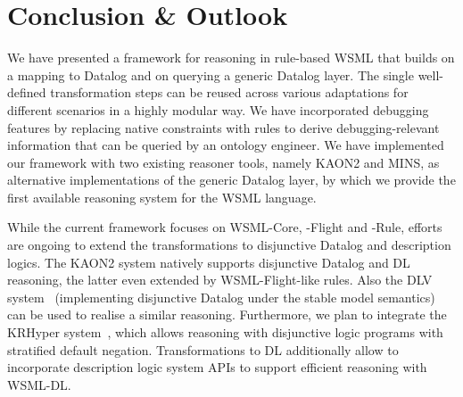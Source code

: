 \section{Conclusion \& Outlook\vspace{-3mm}\label{sec:outlook}}
We have presented a framework for reasoning in rule-based WSML
that builds on a mapping to Datalog and on querying a generic
Datalog layer. The single well-defined transformation steps can be
reused across various adaptations for different scenarios in a
highly modular way. We have incorporated debugging features by
replacing native constraints with rules to derive
debugging-relevant information that can be queried by an ontology
engineer. We have implemented our framework with two existing
reasoner tools, namely KAON2 and MINS, as alternative
implementations of the generic Datalog layer, by which we provide
the first available reasoning system for the WSML language.

While the current framework focuses on WSML-Core, -Flight and
-Rule, efforts are ongoing to extend the transformations to
disjunctive Datalog and description logics. The KAON2 system
natively supports disjunctive Datalog and DL reasoning, the latter
even extended by WSML-Flight-like rules. Also the DLV
system~\cite{citrigno97dlv} (implementing disjunctive Datalog
under the stable model semantics) can be used to realise a similar
reasoning. Furthermore, we plan to integrate the KRHyper
system~\cite{wernhard03system}, which allows reasoning with
disjunctive logic programs with stratified default negation.
Transformations to DL additionally allow to incorporate
description logic system APIs to support efficient reasoning with
WSML-DL.


